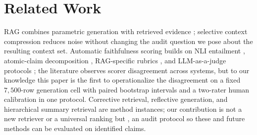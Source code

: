 \section{Related Work}
\label{sec:related_work}

RAG combines parametric generation with retrieved evidence
\citep{lewis2020rag,karpukhin2020dpr}; selective context compression
\citep{xu2024recomp} reduces noise without changing the audit question we
pose about the resulting context set. Automatic faithfulness scoring builds
on NLI entailment \citep{honovich2022true,laban2022summac}, atomic-claim
decomposition \citep{min2023factscore}, RAG-specific rubrics
\citep{es2024ragas}, and LLM-as-a-judge protocols \citep{liu2023geval}; the
literature observes scorer disagreement across systems, but to our knowledge
this paper is the first to operationalize the disagreement on a fixed
$7{,}500$-row generation cell with paired bootstrap intervals and a two-rater
human calibration in one protocol. Corrective retrieval, reflective
generation, and hierarchical summary retrieval
\citep{yan2024crag,asai2024selfrag,raptor2024} are method instances; our
contribution is not a new retriever or a universal ranking but \method{}, an
audit protocol so these and future methods can be evaluated on identified
claims.
